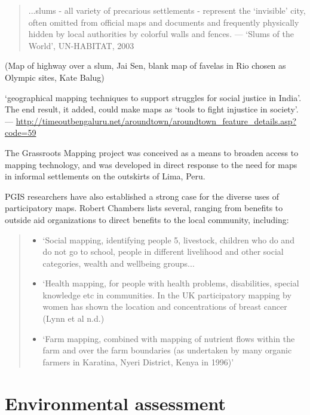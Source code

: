 \documentclass[11pt,oneside,notitlepage]{report}
\begin{document}
\begin{quote}
...slums - all variety of precarious settlements - represent the `invisible' city, often omitted from official maps and documents and frequently physically hidden by local authorities by colorful walls and fences. 
--- `Slums of the World', UN-HABITAT, 2003 \cite{}
\end{quote}

(Map of highway over a slum, Jai Sen, blank map of favelas in Rio chosen as Olympic sites, Kate Balug)

`geographical mapping techniques to support struggles for social justice in India'. The end result, it added, could make maps as `tools to fight injustice in society'.
--- \url{http://timeoutbengaluru.net/aroundtown/aroundtown_feature_details.asp?code=59}

The Grassroots Mapping project was conceived as a means to broaden access to mapping technology, and was developed in direct response to the need for maps in informal settlements on the outskirts of Lima, Peru.

PGIS researchers have also established a strong case for the diverse uses of participatory maps. Robert Chambers lists several, ranging from benefits to outside aid organizations to direct benefits to the local community, including:

\begin{quote}
\begin{itemize}
	\item{`Social mapping, identifying people 5, livestock, children who do and do not go to school, people in different livelihood and other social categories, wealth and wellbeing groups...}
	\item{`Health mapping, for people with health problems, disabilities, special knowledge etc in communities. In the UK participatory mapping by women has shown the location and concentrations of breast cancer (Lynn et al n.d.)}
	\item{`Farm mapping, combined with mapping of nutrient flows within the farm and over the farm boundaries (as undertaken by many organic farmers in Karatina, Nyeri District, Kenya in 1996)'}
\end{itemize}
\cite{chambers2006whose}
\end{quote}

\section{Environmental assessment}
\end{document}
